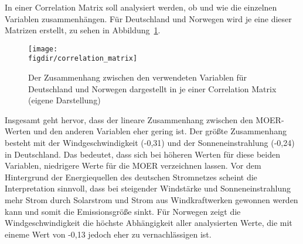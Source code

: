 In einer Correlation Matrix soll analysiert werden, ob und wie die einzelnen Variablen zusammenhängen.
Für Deutschland und Norwegen wird je eine dieser Matrizen erstellt, zu sehen in Abbildung~\ref{FIG:correlation_matrix}.
\begin{figure}
 \caption{Der Zusammenhang zwischen den verwendeten Variablen für Deutschland und Norwegen dargestellt in je einer Correlation Matrix (eigene Darstellung)}
 {\texttt{[image: \\figdir/correlation\_matrix]}}
 \label{FIG:correlation_matrix}
\end{figure}
Insgesamt geht hervor, dass der lineare Zusammenhang zwischen den \ac{MOER}-Werten und den anderen Variablen eher gering ist.
Der größte Zusammenhang besteht mit der Windgeschwindigkeit (-0,31) und der Sonneneinstrahlung (-0,24) in Deutschland.
Das bedeutet, dass sich bei höheren Werten für diese beiden Variablen, niedrigere Werte für die \ac{MOER} verzeichnen lassen.
Vor dem Hintergrund der Energiequellen des deutschen Stromnetzes scheint die Interpretation sinnvoll, dass bei steigender Windstärke und Sonneneinstrahlung mehr Strom durch Solarstrom und Strom aus Windkraftwerken gewonnen werden kann und somit die Emissionsgröße sinkt.
Für Norwegen zeigt die Windgeschwindigkeit die höchste Abhängigkeit aller analysierten Werte, die mit eineme Wert von -0,13 jedoch eher zu vernachlässigen ist.

